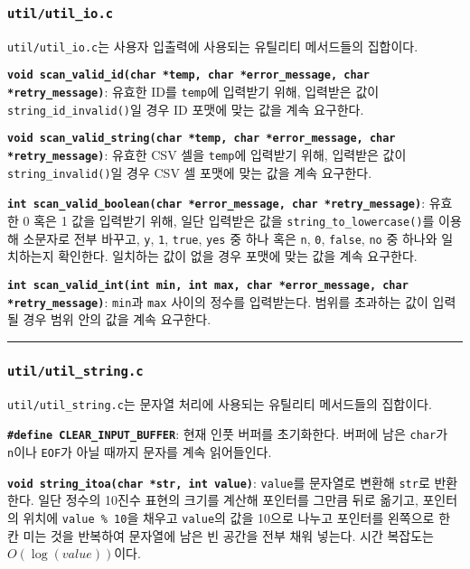 \documentclass[runningheads]{llncs}
\begin{document}
\subsubsection{\texttt{util/util_io.c}}
\texttt{util/util_io.c}는 사용자 입출력에 사용되는 유틸리티 메서드들의 집합이다.

\textbf{\texttt{void scan_valid_id(char *temp, char *error_message, char *retry_message)}}: 유효한 ID를 \texttt{temp}에 입력받기 위해, 입력받은 값이 \texttt{string_id_invalid()}일 경우 ID 포맷에 맞는 값을 계속 요구한다.

\textbf{\texttt{void scan_valid_string(char *temp, char *error_message, char *retry_message)}}: 유효한 CSV 셀을 \texttt{temp}에 입력받기 위해, 입력받은 값이 \texttt{string_invalid()}일 경우 CSV 셀 포맷에 맞는 값을 계속 요구한다.

\textbf{\texttt{int scan_valid_boolean(char *error_message, char *retry_message)}}: 유효한 0 혹은 1 값을 입력받기 위해, 일단 입력받은 값을 \texttt{string_to_lowercase()}를 이용해 소문자로 전부 바꾸고, \texttt{y}, \texttt{1}, \texttt{true}, \texttt{yes} 중 하나 혹은 \texttt{n}, \texttt{0}, \texttt{false}, \texttt{no} 중 하나와 일치하는지 확인한다. 일치하는 값이 없을 경우 포맷에 맞는 값을 계속 요구한다.

\textbf{\texttt{int scan_valid_int(int min, int max, char *error_message, char *retry_message)}}: \texttt{min}과 \texttt{max} 사이의 정수를 입력받는다. 범위를 초과하는 값이 입력될 경우 범위 안의 값을 계속 요구한다.

\noindent\rule{2cm}{0.4pt}

\subsubsection{\texttt{util/util_string.c}}
\texttt{util/util_string.c}는 문자열 처리에 사용되는 유틸리티 메서드들의 집합이다.

\textbf{\texttt{\#define CLEAR_INPUT_BUFFER}}: 현재 인풋 버퍼를 초기화한다\cite{flush}. 버퍼에 남은 \texttt{char}가 \texttt{\\n}이나 \texttt{EOF}가 아닐 때까지 문자를 계속 읽어들인다.

\textbf{\texttt{void string_itoa(char *str, int value)}}: \texttt{value}를 문자열로 변환해 \texttt{str}로 반환한다. 일단 정수의 10진수 표현의 크기를 계산해 포인터를 그만큼 뒤로 옮기고, 포인터의 위치에 \texttt{value \% 10}을 채우고 \texttt{value}의 값을 10으로 나누고 포인터를 왼쪽으로 한 칸 미는 것을 반복하여 문자열에 남은 빈 공간을 전부 채워 넣는다. 시간 복잡도는 $O(\log(value))$이다.
\end{document}

